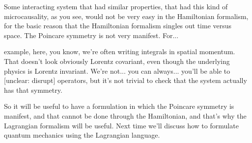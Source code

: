 
Some interacting system that had similar properties, that had this kind of microcausality, as you see, would not be very easy in the Hamiltonian formalism, for the basic reason that the Hamiltonian formalism singles out time versus space. The Poincare symmetry is not very manifest. For...


example, here, you know, we're often writing integrals in spatial momentum. That doesn't look obviously Lorentz covariant, even though the underlying physics is Lorentz invariant. We're not... you can always... you'll be able to [unclear: disrupt] operators, but it's not trivial to check that the system actually has that symmetry.


So it will be useful to have a formulation in which the Poincare symmetry is manifest, and that cannot be done through the Hamiltonian, and that's why the Lagrangian formalism will be useful. Next time we'll discuss how to formulate quantum mechanics using the Lagrangian language.


